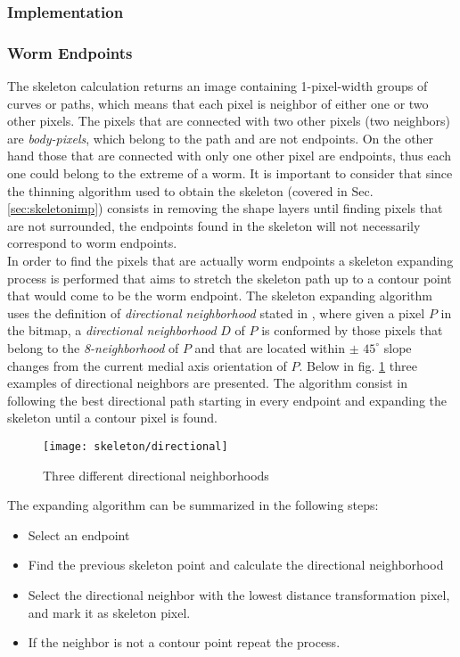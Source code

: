\subsubsection{Implementation}
\label{segmentimp}


\subsubsection*{Worm Endpoints}
\label{sec:wend}
The skeleton calculation returns an image 
containing 1-pixel-width groups of curves or paths, which means that each pixel 
is neighbor of either one or two other pixels. The pixels that are connected with 
two other pixels (two neighbors) are \emph{body-pixels}, which belong 
to the path and are not endpoints. On the other hand those that are connected with 
only one other pixel are endpoints, thus each one could belong to the extreme of a
worm. It is important to consider that since the thinning algorithm used to obtain
the skeleton (covered in Sec. \ref{sec:skeletonimp}) consists in removing the shape
layers until finding pixels that are not surrounded, the endpoints found in the
skeleton will not necessarily correspond to worm endpoints.\\

In order to find the pixels that are actually worm endpoints a skeleton expanding process
is performed that aims to stretch the skeleton path up to a contour point that 
would come to be the worm endpoint. The skeleton expanding algorithm uses the definition
of \emph{directional neighborhood} stated in \cite[p.334]{maxima}, where given 
a pixel $P$ in the bitmap, a \emph{directional neighborhood} $D$ of $P$ is 
conformed by those pixels that belong to the \emph{8-neighborhood} of $P$ and that
are located within $\pm$ $45^{\circ}$ slope changes from the current medial axis 
orientation of $P$. Below in fig. \ref{fig:directional} three examples of directional
neighbors are presented. The algorithm consist in following the best directional path
starting in every endpoint and expanding the skeleton until a contour pixel is found.
 
\begin{figure}[h t b p ! H]
 \centering
   \texttt{[image: skeleton/directional]}
 \caption{Three different directional neighborhoods}
 \label{fig:directional}
\end{figure}

The expanding algorithm can be summarized in the following steps:
\begin{itemize}
\item Select an endpoint
\item Find the previous skeleton point and calculate the directional neighborhood
\item Select the directional neighbor with the lowest distance transformation pixel,
  and mark it as skeleton pixel.
\item If the neighbor is not a contour point repeat the process.
\end{itemize}

